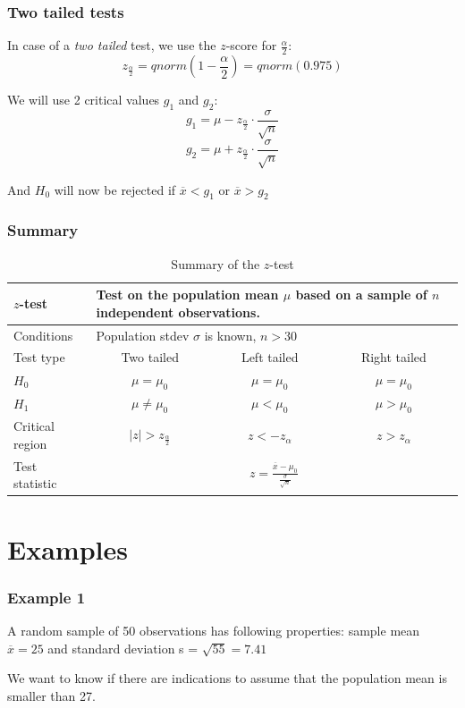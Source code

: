 \documentclass{beamer}
\begin{document}
\begin{frame}
  \frametitle{Two tailed tests}
  In case of a \emph{two tailed} test, we use the $z$-score for $\frac{\alpha}{2}$:
  \[ z_{\frac{\alpha}{2}} = qnorm(1-\frac{\alpha}{2})=qnorm(0.975) \]

  We will use 2 critical values $g_1$ and $g_2$:
  \[ g_1 = \mu - z_\frac{\alpha}{2} \cdot \frac{\sigma}{\sqrt{n}} \]
  \[ g_2 = \mu + z_\frac{\alpha}{2} \cdot \frac{\sigma}{\sqrt{n}} \]

  And $H_0$ will now be rejected if $\overline{x}<g_1$ or $\overline{x}>g_2$
\end{frame}

\begin{frame}
  \frametitle{Summary}

\begin{table}
  \centering
  \begin{tabular}{l|ccc}
    \toprule
    $z$-test              & \multicolumn{3}{l}{\parbox{.7\textwidth}{Test on the population mean $\mu$ based on a sample of $n$ \textbf{independent} observations.}} \\
    \midrule
    Conditions        & \multicolumn{3}{l}{\parbox{.7\textwidth}{Population stdev $\sigma$ is known, $n>30$}} \\
    \midrule
    Test type         & Two tailed           & Left tailed & Right tailed \\
    \midrule
    $H_{0}$           & $\mu = \mu_{0}$      & $\mu = \mu_{0}$ & $\mu = \mu_{0}$  \\
    $H_{1}$           & $\mu \neq \mu_{0}$   & $\mu < \mu_{0}$ & $\mu > \mu_{0}$  \\
    Critical region   & $\left|z\right| > z_\frac{\alpha}{2}$ & $z< -z_\alpha $        & $z>z_\alpha$            \\
    Test statistic    & \multicolumn{3}{c}{$z = \frac{\overline{x} - \mu_{0}}{\frac{\sigma}{\sqrt{n}}}$} \\
    \bottomrule
  \end{tabular}
  \caption{Summary of the $z$-test}
  \label{tab:toetsingsprocedures}
\end{table}
\end{frame}

\section{Examples}
\sectionframelogo{}

\begin{frame}
  \frametitle{Example 1}
  A random sample of 50 observations has following properties: sample mean $\overline{x} = 25$ and standard deviation s = $\sqrt{55} = 7.41$
  
  We want to know if there are indications to assume that the population mean is smaller than 27.
\end{frame}
\end{document}
